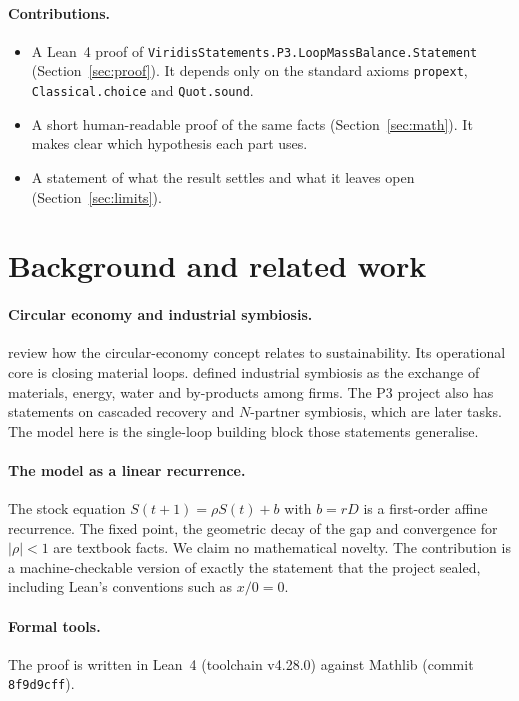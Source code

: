 \documentclass[11pt]{article}
\theoremstyle{definition}
\theoremstyle{remark}
\begin{document}
\paragraph{Contributions.}
\begin{itemize}
\item A Lean~4 proof of \texttt{ViridisStatements.P3.LoopMassBalance.Statement}
(Section~\ref{sec:proof}). It depends only on the standard axioms \texttt{propext},
\texttt{Classical.choice} and \texttt{Quot.sound}.
\item A short human-readable proof of the same facts (Section~\ref{sec:math}). It makes clear
which hypothesis each part uses.
\item A statement of what the result settles and what it leaves open
(Section~\ref{sec:limits}).
\end{itemize}

\section{Background and related work}
\paragraph{Circular economy and industrial symbiosis.}
\citet{geissdoerfer2017} review how the circular-economy concept relates to sustainability.
Its operational core is closing material loops. \citet{chertow2000} defined industrial
symbiosis as the exchange of materials, energy, water and by-products among firms. The P3
project also has statements on cascaded recovery and $N$-partner symbiosis, which are later
tasks. The model here is the single-loop building block those statements generalise.

\paragraph{The model as a linear recurrence.}
The stock equation $S(t+1)=\rho S(t)+b$ with $b=rD$ is a first-order affine recurrence. The
fixed point, the geometric decay of the gap and convergence for $|\rho|<1$ are textbook facts.
We claim no mathematical novelty. The contribution is a machine-checkable version of exactly
the statement that the project sealed, including Lean's conventions such as $x/0=0$.

\paragraph{Formal tools.}
The proof is written in Lean~4 \citep{moura2021lean4} (toolchain v4.28.0) against Mathlib
\citep{mathlib2020} (commit \texttt{8f9d9cff}).
\end{document}
